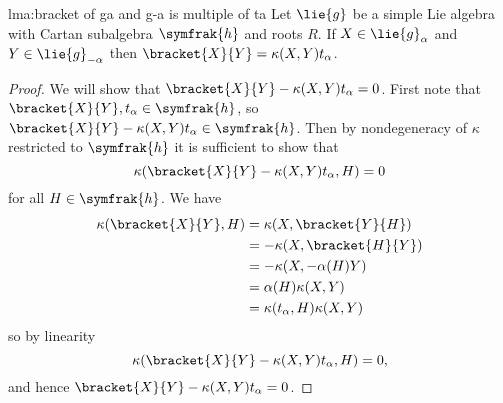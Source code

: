 \documentclass[fleqn]{NotesClass}
\newcommand{\csa}{\symfrak{h}}
\begin{document}
    \begin{lma}{}{lma:bracket of ga and g-a is multiple of ta}
        Let \(\lie{g}\) be a simple Lie algebra with Cartan subalgebra \(\csa\) and roots \(R\).
        If \(X \in \lie{g}_\alpha\) and \(Y \in \lie{g}_{-\alpha}\) then \(\bracket{X}{Y} = \kappa(X, Y) t_\alpha\).
        \begin{proof}
            We will show that \(\bracket{X}{Y} - \kappa(X, Y)t_\alpha = 0\).
            First note that \(\bracket{X}{Y}, t_\alpha \in \csa\), so \(\bracket{X}{Y} - \kappa(X, Y) t_\alpha \in \csa\).
            Then by nondegeneracy of \(\kappa\) restricted to \(\csa\) it is sufficient to show that
            \begin{equation}
                \kappa(\bracket{X}{Y} - \kappa(X, Y)t_\alpha, H) = 0
            \end{equation}
            for all \(H \in \csa\).
            We have
            \begin{align}
                \kappa(\bracket{X}{Y}, H) &= \kappa(X, \bracket{Y}{H})\\
                &= -\kappa(X, \bracket{H}{Y})\\
                &= -\kappa(X, -\alpha(H)Y)\\
                &= \alpha(H) \kappa(X, Y)\\
                &= \kappa(t_\alpha, H) \kappa(X, Y)
            \end{align}
            so by linearity
            \begin{equation}
                \kappa(\bracket{X}{Y} - \kappa(X, Y)t_\alpha, H) = 0,
            \end{equation}
            and hence \(\bracket{X}{Y} - \kappa(X, Y)t_\alpha = 0\).
        \end{proof}
    \end{lma}
    
\end{document}
